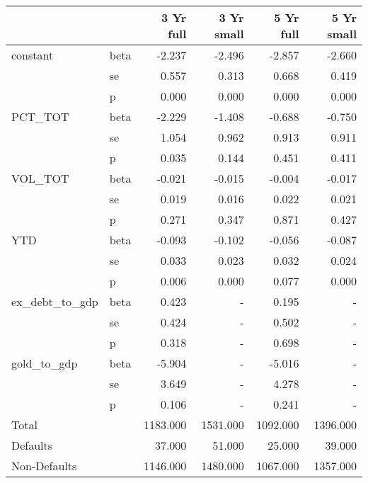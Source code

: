 \begin{tabular}{llrrrr}
\toprule
             &     &  3 Yr full &  3 Yr small &  5 Yr full &  5 Yr small \\
\midrule
constant & beta &     -2.237 &      -2.496 &     -2.857 &      -2.660 \\
             & se &      0.557 &       0.313 &      0.668 &       0.419 \\
             & p &      0.000 &       0.000 &      0.000 &       0.000 \\
PCT\_TOT & beta &     -2.229 &      -1.408 &     -0.688 &      -0.750 \\
             & se &      1.054 &       0.962 &      0.913 &       0.911 \\
             & p &      0.035 &       0.144 &      0.451 &       0.411 \\
VOL\_TOT & beta &     -0.021 &      -0.015 &     -0.004 &      -0.017 \\
             & se &      0.019 &       0.016 &      0.022 &       0.021 \\
             & p &      0.271 &       0.347 &      0.871 &       0.427 \\
YTD & beta &     -0.093 &      -0.102 &     -0.056 &      -0.087 \\
             & se &      0.033 &       0.023 &      0.032 &       0.024 \\
             & p &      0.006 &       0.000 &      0.077 &       0.000 \\
ex\_debt\_to\_gdp & beta &      0.423 &         - &      0.195 &         - \\
             & se &      0.424 &         - &      0.502 &         - \\
             & p &      0.318 &         - &      0.698 &         - \\
gold\_to\_gdp & beta &     -5.904 &         - &     -5.016 &         - \\
             & se &      3.649 &         - &      4.278 &         - \\
             & p &      0.106 &         - &      0.241 &         - \\
Total &  &   1183.000 &    1531.000 &   1092.000 &    1396.000 \\
Defaults &  &     37.000 &      51.000 &     25.000 &      39.000 \\
Non-Defaults &  &   1146.000 &    1480.000 &   1067.000 &    1357.000 \\
\bottomrule
\end{tabular}
